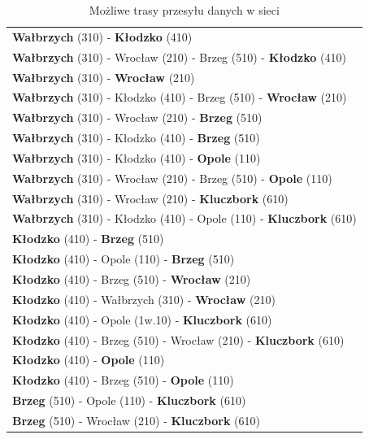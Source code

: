 \documentclass[a4paper]{article}
\begin{document}
\begin{table}[H]
	\centering
	\caption{Możliwe trasy przesyłu danych w sieci}
	\begin{tabular}{l}
		\hline
        \textbf{Wałbrzych} (310) - \textbf{Kłodzko} (410)\\
        \textbf{Wałbrzych} (310) - Wrocław (210) - Brzeg (510) - \textbf{Kłodzko} (410)\\
        \hline
        \textbf{Wałbrzych} (310) - \textbf{Wrocław} (210) \\
		\textbf{Wałbrzych} (310) - Kłodzko (410) - Brzeg (510) - \textbf{Wrocław} (210) \\
        \hline
        \textbf{Wałbrzych} (310) - Wrocław (210) - \textbf{Brzeg} (510) \\
        \textbf{Wałbrzych} (310) - Kłodzko (410) - \textbf{Brzeg} (510) \\
        \hline
        \textbf{Wałbrzych} (310) - Kłodzko (410) - \textbf{Opole} (110) \\
        \textbf{Wałbrzych} (310) - Wrocław (210) - Brzeg (510) - \textbf{Opole} (110)  \\
        \hline
        \textbf{Wałbrzych} (310) - Wrocław (210) - \textbf{Kluczbork} (610) \\
        \textbf{Wałbrzych} (310) - Kłodzko (410) - Opole (110) - \textbf{Kluczbork} (610) \\
        \hline
        \textbf{Kłodzko} (410) - \textbf{Brzeg} (510) \\
        \textbf{Kłodzko} (410) - Opole (110) - \textbf{Brzeg} (510) \\
        \hline
        \textbf{Kłodzko} (410) - Brzeg (510) - \textbf{Wrocław} (210) \\
        \textbf{Kłodzko} (410) - Wałbrzych (310) - \textbf{Wrocław} (210) \\
        \hline
        \textbf{Kłodzko} (410) - Opole (1w.10) - \textbf{Kluczbork} (610) \\
        \textbf{Kłodzko} (410) - Brzeg (510) - Wrocław (210) - \textbf{Kluczbork} (610)\\
        \hline
        \textbf{Kłodzko} (410) - \textbf{Opole} (110) \\
        \textbf{Kłodzko} (410) - Brzeg (510) - \textbf{Opole} (110)\\
        \hline
        \textbf{Brzeg} (510) - Opole (110) - \textbf{Kluczbork} (610) \\
		\textbf{Brzeg} (510) - Wrocław (210) - \textbf{Kluczbork} (610) \\

\end{tabular}
\end{table}
\end{document}
